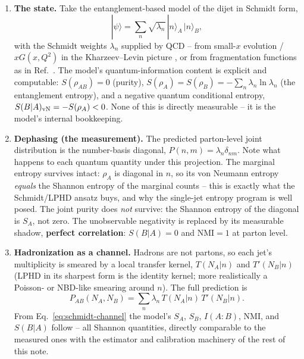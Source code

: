 \documentclass[11pt]{article}
\newcommand{\SBA}{S(B|A)}
\newcommand{\NMI}{\mathrm{NMI}}
\begin{document}
\begin{enumerate}
\item \textbf{The state.} Take the entanglement-based model of the dijet
in Schmidt form,
\begin{equation}
|\psi\rangle=\sum_n \sqrt{\lambda_n}\,|n\rangle_A\,|n\rangle_B,
\end{equation}
with the Schmidt weights $\lambda_n$ supplied by QCD -- from small-$x$
evolution / $xG(x,Q^2)$ in the Kharzeev--Levin picture \cite{KL2017}, or
from fragmentation functions as in Ref.~\cite{Datta2025}. The model's
quantum-information content is explicit and computable:
$S(\rho_{AB})=0$ (purity),
$S(\rho_A)=S(\rho_B)=-\sum_n\lambda_n\ln\lambda_n$ (the entanglement
entropy), and a negative quantum conditional entropy,
$S(B|A)_{\rm vN}=-S(\rho_A)<0$. None of this is directly measurable --
it is the model's internal bookkeeping.
\item \textbf{Dephasing (the measurement).} The predicted parton-level
joint distribution is the number-basis diagonal,
$P(n,m)=\lambda_n\delta_{nm}$. Note what happens to each quantum
quantity under this projection. The marginal entropy survives intact:
$\rho_A$ is diagonal in $n$, so its von Neumann entropy \emph{equals}
the Shannon entropy of the marginal counts -- this is exactly what the
Schmidt/LPHD ansatz buys, and why the single-jet entropy program
\cite{TKU2020,H1_2021,Datta2025} is well posed. The joint purity does
\emph{not} survive: the Shannon entropy of the diagonal is $S_A$, not
zero. The unobservable negativity is replaced by its measurable shadow,
\textbf{perfect correlation}: $\SBA=0$ and $\NMI=1$ at parton level.
\item \textbf{Hadronization as a channel.} Hadrons are not partons, so
each jet's multiplicity is smeared by a local transfer kernel,
$T(N_A|n)$ and $T'(N_B|n)$ (LPHD in its sharpest form is the identity
kernel; more realistically a Poisson- or NBD-like smearing around $n$).
The full prediction is
\begin{equation}
P_{AB}(N_A,N_B)=\sum_n \lambda_n\,T(N_A|n)\,T'(N_B|n).
\label{eq:schmidt-channel}
\end{equation}
From Eq.~\eqref{eq:schmidt-channel} the model's $S_A$, $S_B$,
$I(A{:}B)$, $\NMI$, and $\SBA$ follow -- all Shannon quantities,
directly comparable to the measured ones with the estimator and
calibration machinery of the rest of this note.
\end{enumerate}
\end{document}
